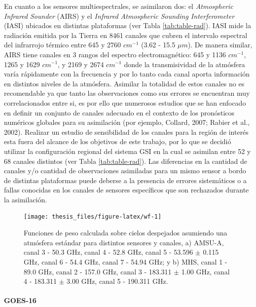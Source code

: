 \documentclass[12pt,oneside,a4paper]{reedthesis}
\begin{document}
En cuanto a los sensores multiespectrales, se asimilaron dos: el \emph{Atmospheric Infrared Sounder} (AIRS) y el \emph{Infrared Atmospheric Sounding Interferometer} (IASI) ubicados en distintas plataformas (ver Tabla \ref{tab:table-rad}). IASI mide la radiación emitida por la Tierra en 8461 canales que cubren el intervalo espectral del infrarrojo térmico entre 645 y 2760 \(cm^{-1}\) (3.62 - 15.5 \(\mu m\)). De manera similar, AIRS tiene canales en 3 rangos del espectro electromagnético: 645 y 1136 \(cm^{-1}\), 1265 y 1629 \(cm^{-1}\), y 2169 y 2674 \(cm^{-1}\) donde la transmisividad de la atmósfera varía rápidamente con la frecuencia y por lo tanto cada canal aporta información en distintos niveles de la atmósfera. Asimilar la totalidad de estos canales no es recomendable ya que tanto las observaciones como sus errores se encuentran muy correlacionados entre si, es por ello que numerosos estudios que se han enfocado en definir un conjunto de canales adecuado en el contexto de los pronósticos numéricos globales para su asimilación (por ejemplo, Collard, 2007; Rabier et al., 2002). Realizar un estudio de sensibilidad de los canales para la región de interés esta fuera del alcance de los objetivos de este trabajo, por lo que se decidió utilizar la configuración regional del sistema GSI en la cual se asimilan entre 52 y 68 canales distintos (ver Tabla \ref{tab:table-rad}). Las diferencias en la cantidad de canales y/o cantidad de observaciones asimiladas para un mismo sensor a bordo de distintas plataformas puede deberse a la presencia de errores sistemáticos o a fallas conocidas en los canales de sensores específicos que son rechazados durante la asimilación.


\begin{figure}

{\centering \texttt{[image: thesis\_files/figure-latex/wf-1]} 

}

\caption{Funciones de peso calculada sobre cielos despejados asumiendo una atmósfera estándar para distintos sensores y canales, a) AMSU-A, canal 3 - 50.3 GHz, canal 4 - 52.8 GHz, canal 5 - 53.596 \(\pm\) 0.115 GHz, canal 6 - 54.4 GHz, canal 7 - 54.94 GHz; y b) MHS, canal 1 - 89.0 GHz, canal 2 - 157.0 GHz, canal 3 - 183.311 \(\pm\) 1.00 GHz, canal 4 - 183.311 \(\pm\) 3.00 GHz, canal 5 - 190.311 GHz.}\label{fig:wf}
\end{figure}
\hypertarget{goes-16}{%
\paragraph{GOES-16}\label{goes-16}}
\end{document}
